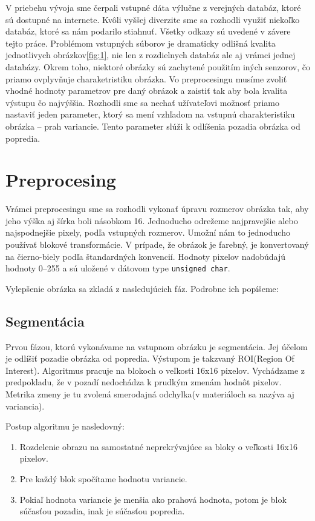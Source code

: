 \documentclass[11pt,a4paper]{article}
\begin{document}
V priebehu vývoja sme čerpali vstupné dáta výlučne z verejných databáz, ktoré sú dostupné na internete. Kvôli vyššej diverzite sme sa rozhodli využiť niekoľko databáz, ktoré sa nám podarilo stiahnuť. Všetky odkazy sú uvedené v závere tejto práce. Problémom vstupných súborov je dramaticky odlišná kvalita jednotlivych obrázkov\ref{fig:1}, nie len z rozdielnych databáz ale aj vrámci jednej databázy. Okrem toho, niektoré obrázky sú zachytené použitím iných senzorov, čo priamo ovplyvňuje charaketristiku obrázka. Vo preprocesingu musíme zvoliť vhodné hodnoty parametrov pre daný obrázok a zaistiť tak aby bola kvalita výstupu čo najvýššia. Rozhodli sme sa nechať užívateľovi možnosť priamo nastaviť jeden parameter, ktorý sa mení vzhľadom na vstupnú charakteristiku obrázka -- prah variancie. Tento parameter slúži k odlíšenia pozadia obrázka od popredia.

\section*{Preprocesing}
Vrámci preprocesingu sme sa rozhodli vykonať úpravu rozmerov obrázka tak, aby jeho výška aj šírka boli násobkom 16. Jednoducho odrežeme najpravejšie alebo najspodnejšie pixely, podľa vstupných rozmerov. Umožní nám to jednoducho používať blokové transformácie. 
V prípade, že obrázok je farebný, je konvertovaný na čierno-biely podľa štandardných konvencií. Hodnoty pixelov nadobúdajú hodnoty 0--255 a sú uložené v dátovom type \texttt{unsigned char}.

Vylepšenie obrázka sa zkladá z nasledujúcich fáz. Podrobne ich popíšeme:

\subsection*{Segmentácia}
Prvou fázou, ktorú vykonávame na vstupnom obrázku je segmentácia. Jej účelom je odlíšiť pozadie obrázka od popredia. Výstupom je takzvaný ROI(Region Of Interest). Algoritmus pracuje na blokoch o veľkosti 16x16 pixelov. Vychádzame z predpokladu, že v pozadí nedochádza k prudkým zmenám hodnôt pixelov. Metrika zmeny je tu zvolená smerodajná odchylka(v materiáloch sa nazýva aj variancia).

Postup algoritmu je nasledovný:
\begin{enumerate}
	\item Rozdelenie obrazu na samostatné neprekrývajúce sa bloky o veľkosti 16x16 pixelov.
	\item Pre každý blok spočítame hodnotu variancie.
	\item Pokiaľ hodnota variancie je menšia ako prahová hodnota, potom je blok súčasťou pozadia, inak je súčasťou popredia.
\end{enumerate}
\end{document}
